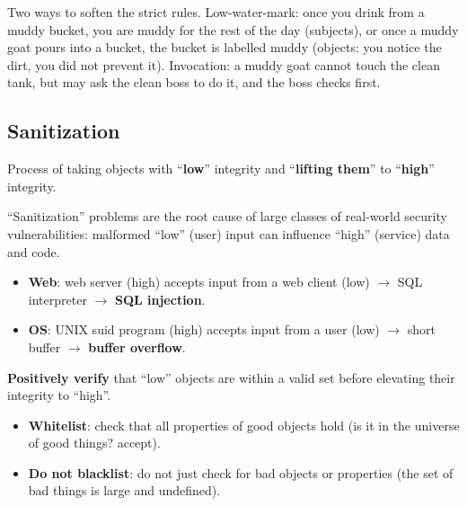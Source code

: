 \begin{goatbox}
Two ways to soften the strict rules. Low-water-mark: once you drink from a muddy bucket, you are
muddy for the rest of the day (subjects), or once a muddy goat pours into a bucket, the bucket is
labelled muddy (objects: you notice the dirt, you did not prevent it). Invocation: a muddy goat
cannot touch the clean tank, but may ask the clean boss to do it, and the boss checks first.
\end{goatbox}

\subsection{Sanitization}

\begin{defnbox}[title=Sanitization]
Process of taking objects with ``\textbf{low}'' integrity and ``\textbf{lifting them}''
to ``\textbf{high}'' integrity.
\end{defnbox}

\begin{warnbox}[title=Root cause of many vulnerabilities]
``Sanitization'' problems are the root cause of large classes of real-world security
vulnerabilities: malformed ``low'' (user) input can influence ``high'' (service) data
and code.
\begin{itemize}
  \item \textbf{Web}: web server (high) accepts input from a web client (low) $\to$ SQL
        interpreter $\to$ \textbf{SQL injection}.
  \item \textbf{OS}: UNIX suid program (high) accepts input from a user (low) $\to$
        short buffer $\to$ \textbf{buffer overflow}.
\end{itemize}
\end{warnbox}

\begin{propbox}[title=Fundamental principle of sanitization (fail-safe defaults)]
\textbf{Positively verify} that ``low'' objects are within a valid set before elevating
their integrity to ``high''.
\begin{itemize}
  \item \textbf{Whitelist}: check that all properties of good objects hold (is it in the
        universe of good things? accept).
  \item \textbf{Do not blacklist}: do not just check for bad objects or properties (the
        set of bad things is large and undefined).
\end{itemize}
\end{propbox}

